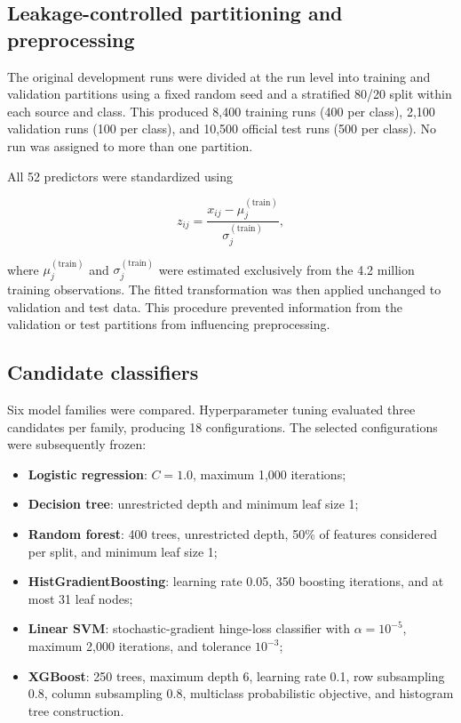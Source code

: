 \documentclass[10pt,twocolumn,a4paper]{article}
\begin{document}
\subsection{Leakage-controlled partitioning and preprocessing}
\label{sec:split}

The original development runs were divided at the run level into training and
validation partitions using a fixed random seed and a stratified 80/20 split
within each source and class. This produced 8,400 training runs (400 per class),
2,100 validation runs (100 per class), and 10,500 official test runs (500 per
class). No run was assigned to more than one partition.

All 52 predictors were standardized using

\begin{equation}
z_{ij}=\frac{x_{ij}-\mu_j^{(\mathrm{train})}}
{\sigma_j^{(\mathrm{train})}},
\end{equation}

where $\mu_j^{(\mathrm{train})}$ and $\sigma_j^{(\mathrm{train})}$ were
estimated exclusively from the 4.2 million training observations. The fitted
transformation was then applied unchanged to validation and test data. This
procedure prevented information from the validation or test partitions from
influencing preprocessing.

\subsection{Candidate classifiers}

Six model families were compared. Hyperparameter tuning evaluated three
candidates per family, producing 18 configurations. The selected configurations
were subsequently frozen:

\begin{itemize}
  \item \textbf{Logistic regression}: $C=1.0$, maximum 1,000 iterations;
  \item \textbf{Decision tree}: unrestricted depth and minimum leaf size 1;
  \item \textbf{Random forest}: 400 trees, unrestricted depth, 50\% of features
  considered per split, and minimum leaf size 1;
  \item \textbf{HistGradientBoosting}: learning rate 0.05, 350 boosting
  iterations, and at most 31 leaf nodes;
  \item \textbf{Linear SVM}: stochastic-gradient hinge-loss classifier with
  $\alpha=10^{-5}$, maximum 2,000 iterations, and tolerance $10^{-3}$;
  \item \textbf{XGBoost}: 250 trees, maximum depth 6, learning rate 0.1,
  row subsampling 0.8, column subsampling 0.8, multiclass probabilistic
  objective, and histogram tree construction.
\end{itemize}
\end{document}
